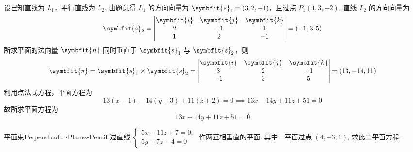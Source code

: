 \begin{solution}
    设已知直线为 $L_1$，平行直线为 $L_2$.
    由题意得 $L_1$ 的方向向量为 $\symbfit{s}_1 = (3, 2, -1)$，且过点 $P_1(1, 3, -2)$.
    直线 $L_2$ 的方向向量为
    \begin{equation}
        \symbfit{s}_2 = \begin{vmatrix} \symbfit{i} & \symbfit{j} & \symbfit{k} \\ 2 & -1 & 1 \\ 1 & 2 & -1 \end{vmatrix} = (-1, 3, 5)
    \end{equation}
    所求平面的法向量 $\symbfit{n}$ 同时垂直于 $\symbfit{s}_1$ 与 $\symbfit{s}_2$，则
    \begin{equation}
        \symbfit{n} = \symbfit{s}_1 \times \symbfit{s}_2 = \begin{vmatrix} \symbfit{i} & \symbfit{j} & \symbfit{k} \\ 3 & 2 & -1 \\ -1 & 3 & 5 \end{vmatrix} = (13, -14, 11)
    \end{equation}
    利用点法式方程，平面方程为
    \begin{equation}
        13(x - 1) - 14(y - 3) + 11(z + 2) = 0 \implies 13x - 14y + 11z + 51 = 0
    \end{equation}
    故所求平面方程为
    \begin{equation}
        \boxed{13x - 14y + 11z + 51 = 0}
    \end{equation}
\end{solution}

\begin{problem}{平面束}{Perpendicular-Planes-Pencil}
    过直线 $\begin{cases} 5x - 11z + 7 = 0, \\ 5y + 7z - 4 = 0 \end{cases}$ 作两互相垂直的平面. 其中一平面过点 $(4, -3, 1)$, 求此二平面方程.
\end{problem}

